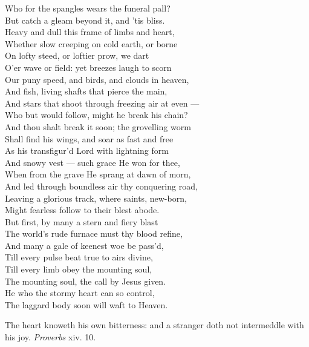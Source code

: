  Who for the spangles wears the funeral pall? \\
 But catch a gleam beyond it, and ’tis bliss. \\
  Heavy and dull this frame of limbs and heart, \\
 Whether slow creeping on cold earth, or borne \\
 On lofty steed, or loftier prow, we dart \\
 O’er wave or field: yet breezes laugh to scorn \\
  Our puny speed, and birds, and clouds in heaven, \\
 And fish, living shafts that pierce the main, \\
 And stars that shoot through freezing air at even — \\
 Who but would follow, might he break his chain? \\
  And thou shalt break it soon; the grovelling worm \\
 Shall find his wings, and soar as fast and free \\
 As his transfigur’d Lord with lightning form \\
 And snowy vest — such grace He won for thee, \\
  When from the grave He sprang at dawn of morn, \\
 And led through boundless air thy conquering road, \\
 Leaving a glorious track, where saints, new-born, \\
 Might fearless follow to their blest abode. \\
  But first, by many a stern and fiery blast \\
 The world’s rude furnace must thy blood refine, \\
 And many a gale of keenest woe be pass’d, \\
 Till every pulse beat true to airs divine, \\
  Till every limb obey the mounting soul, \\
 The mounting soul, the call by Jesus given. \\
 He who the stormy heart can so control, \\
 The laggard body soon will waft to Heaven.\\


The heart knoweth his own bitterness: and a stranger doth not intermeddle with his joy. \emph{Proverbs} xiv. 10.


